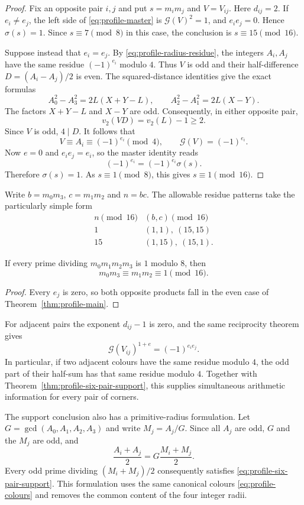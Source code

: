 \begin{proof}
Fix an opposite pair $i,j$ and put $s=m_im_j$ and $V=V_{ij}$.
Here $d_{ij}=2$.  If $e_i\ne e_j$, the left side of
\eqref{eq:profile-master} is $\mathcal G(V)^2=1$, and
$e_ie_j=0$.  Hence $\sigma(s)=1$.  Since $s\equiv7\pmod8$ in
this case, the conclusion is $s\equiv15\pmod{16}$.

Suppose instead that $e_i=e_j$.  By
\eqref{eq:profile-radius-residue}, the integers $A_i,A_j$ have the
same residue $(-1)^{e_i}$ modulo $4$.  Thus $V$ is odd and their
half-difference $D=(A_i-A_j)/2$ is even.  The squared-distance
identities give the exact formulas
\[
 A_0^2-A_3^2=2L(X+Y-L),\qquad
 A_2^2-A_1^2=2L(X-Y).
\]
The factors $X+Y-L$ and $X-Y$ are odd.  Consequently, in either
opposite pair,
\[
 v_2(VD)=v_2(L)-1\ge2.
\]
Since $V$ is odd, $4\mid D$.  It follows that
\[
 V\equiv A_i\equiv(-1)^{e_i}\pmod4,
 \qquad \mathcal G(V)=(-1)^{e_i}.
\]
Now $e=0$ and $e_ie_j=e_i$, so the master identity reads
\[
 (-1)^{e_i}=(-1)^{e_i}\sigma(s).
\]
Therefore $\sigma(s)=1$.  As $s\equiv1\pmod8$, this gives
$s\equiv1\pmod{16}$.
\end{proof}

Write $b=m_0m_3$, $c=m_1m_2$ and $n=bc$.  The allowable residue
patterns take the particularly simple form
\begin{equation}\label{eq:profile-residue-table}
\begin{array}{c|c}
 n\pmod{16}&(b,c)\pmod{16}\\ \hline
 1&(1,1),\ (15,15)\\
 15&(1,15),\ (15,1).
\end{array}
\end{equation}

\begin{corollary}\label{cor:profile-split}
If every prime dividing $m_0m_1m_2m_3$ is $1$ modulo $8$, then
\[
 m_0m_3\equiv m_1m_2\equiv1\pmod{16}.
\]
\end{corollary}

\begin{proof}
Every $e_j$ is zero, so both opposite products fall in the even case
of Theorem~\ref{thm:profile-main}.
\end{proof}

For adjacent pairs the exponent $d_{ij}-1$ is zero, and the same
reciprocity theorem gives
\[
 \mathcal G(V_{ij})^{1+e}=(-1)^{e_ie_j}.
\]
In particular, if two adjacent colours have the same residue modulo
$4$, the odd part of their half-sum has that same residue modulo $4$.
Together with Theorem~\ref{thm:profile-six-pair-support}, this supplies
simultaneous arithmetic information for every pair of corners.

The support conclusion also has a primitive-radius formulation.  Let
$G=\gcd(A_0,A_1,A_2,A_3)$ and write $M_j=A_j/G$.  Since all $A_j$ are
odd, $G$ and the $M_j$ are odd, and
\[
 \frac{A_i+A_j}{2}=G\frac{M_i+M_j}{2}.
\]
Every odd prime dividing $(M_i+M_j)/2$ consequently satisfies
\eqref{eq:profile-six-pair-support}.  This formulation uses the same
canonical colours \eqref{eq:profile-colours} and removes the common
content of the four integer radii.
